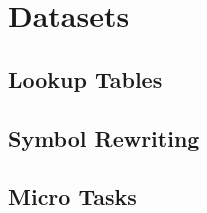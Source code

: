\chapter{Datasets}\label{Chapter:datasets}

\section{Lookup Tables}

\section{Symbol Rewriting}

\section{Micro Tasks}